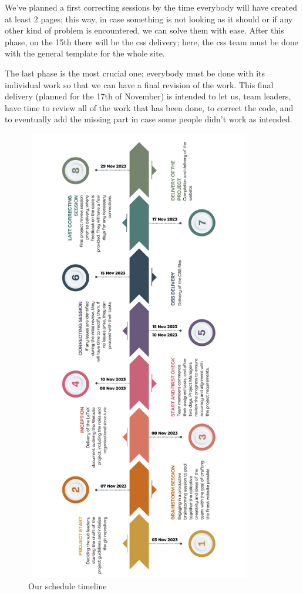 \documentclass{article}
\begin{document}
    We've planned a first correcting sessions by the time everybody will have created at least 2 pages; this way, in case something is not looking as it should or if any other kind of problem is encountered, we can solve them with ease. After this phase, on the 15th there will be the css delivery; here, the css team must be done with the general template for the whole site. 
    
    The last phase is the most crucial one; everybody must be done with its individual work so that we can have a final revision of the work. This final delivery (planned for the 17th of November) is intended to let us, team leaders, have time to review all of the work that has been done, to correct the code, and to eventually add the missing part in case some people didn't work as intended. 
    
    
    \pagebreak
    \vspace{-3cm} 
    \begin{figure}
    	\centering
    	\includegraphics[width=10cm, height=20cm]{timeline.jpg}
	\caption{Our schedule timeline}
	\label{fig:schedule}
    \end{figure}

\end{document}
